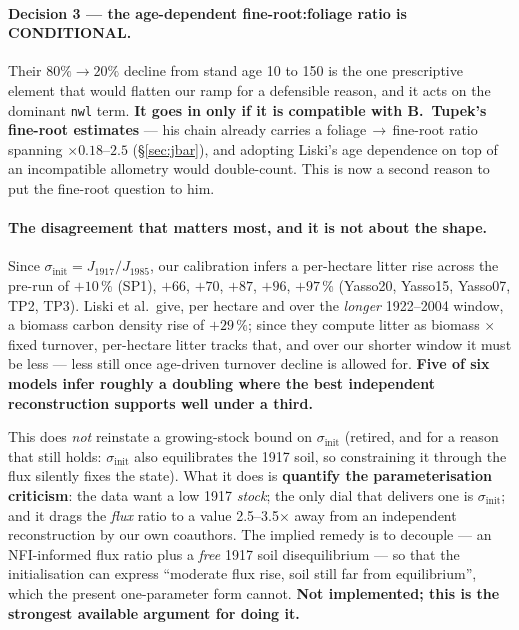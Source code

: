 \documentclass[11pt]{article}
\newcommand{\sinit}{\sigma_{\mathrm{init}}}
\begin{document}
\paragraph{Decision 3 --- the age-dependent fine-root:foliage ratio is CONDITIONAL.} Their
$80\% \to 20\%$ decline from stand age 10 to 150 is the one prescriptive element that would flatten
our ramp for a defensible reason, and it acts on the dominant \texttt{nwl} term. \textbf{It goes in
only if it is compatible with B.\ Tupek's fine-root estimates} --- his chain already carries a
foliage$\,\to\,$fine-root ratio spanning $\times 0.18$--$2.5$ (\S\ref{sec:jbar}), and adopting Liski's
age dependence on top of an incompatible allometry would double-count. This is now a second reason
to put the fine-root question to him.

\paragraph{The disagreement that matters most, and it is not about the shape.} Since
$\sinit = J_{1917}/J_{1985}$, our calibration infers a per-hectare litter rise across the pre-run of
$+10\,\%$ (SP1), $+66$, $+70$, $+87$, $+96$, $+97\,\%$ (Yasso20, Yasso15, Yasso07, TP2, TP3). Liski
et al.\ give, per hectare and over the \emph{longer} 1922--2004 window, a biomass carbon density rise
of $+29\,\%$; since they compute litter as biomass $\times$ fixed turnover, per-hectare litter tracks
that, and over our shorter window it must be less --- less still once age-driven turnover decline is
allowed for. \textbf{Five of six models infer roughly a doubling where the best independent
reconstruction supports well under a third.}

This does \emph{not} reinstate a growing-stock bound on $\sinit$ (retired, and for a reason that still
holds: $\sinit$ also equilibrates the 1917 soil, so constraining it through the flux silently fixes
the state). What it does is \textbf{quantify the parameterisation criticism}: the data want a low 1917
\emph{stock}; the only dial that delivers one is $\sinit$; and it drags the \emph{flux} ratio to a
value 2.5--3.5$\times$ away from an independent reconstruction by our own coauthors. The implied
remedy is to decouple --- an NFI-informed flux ratio plus a \emph{free} 1917 soil disequilibrium ---
so that the initialisation can express ``moderate flux rise, soil still far from equilibrium'', which
the present one-parameter form cannot. \textbf{Not implemented; this is the strongest available
argument for doing it.}
\end{document}
